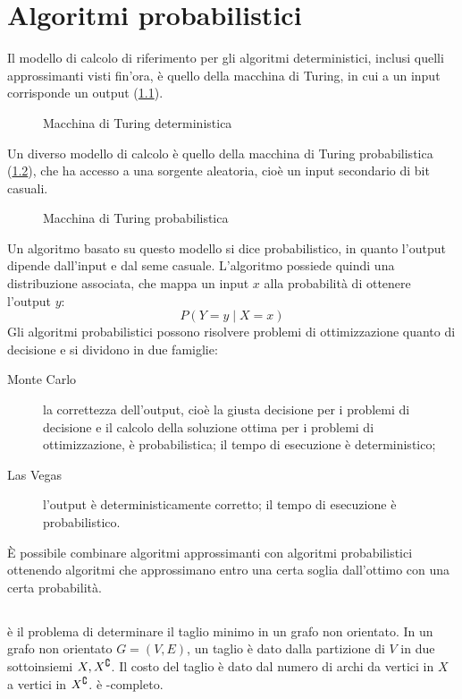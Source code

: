 \chapter{Algoritmi probabilistici}
Il modello di calcolo di riferimento per gli algoritmi deterministici, inclusi quelli approssimanti visti fin'ora, è quello della macchina di Turing, in cui a un input corrisponde un output (\cref{fig:mdtdet}).
\begin{figure}[ht]
	\centering
	
	\caption{Macchina di Turing deterministica}
	\label{fig:mdtdet}
\end{figure}

Un diverso modello di calcolo è quello della macchina di Turing probabilistica (\cref{fig:mdtprob}), che ha accesso a una sorgente aleatoria, cioè un input secondario di bit casuali.

\begin{figure}[ht]
	\centering
	
	\caption{Macchina di Turing probabilistica}
	\label{fig:mdtprob}
\end{figure}

Un algoritmo basato su questo modello si dice probabilistico, in quanto l'output dipende dall'input e dal seme casuale.
L'algoritmo possiede quindi una distribuzione associata, che mappa un input $x$ alla probabilità di ottenere l'output $y$:
\begin{equation*}
	P(Y = y \mid X = x)
\end{equation*}
Gli algoritmi probabilistici possono risolvere problemi di ottimizzazione quanto di decisione e si dividono in due famiglie:
\begin{description}
	\item[Monte Carlo] la correttezza dell'output, cioè la giusta decisione per i problemi di decisione e il calcolo della soluzione ottima per i problemi di ottimizzazione, è probabilistica; il tempo di esecuzione è deterministico;
	\item[Las Vegas] l'output è deterministicamente corretto; il tempo di esecuzione è probabilistico.
\end{description}
È possibile combinare algoritmi approssimanti con algoritmi probabilistici ottenendo algoritmi che approssimano entro una certa soglia dall'ottimo con una certa probabilità.



\section{\MinCut}
\MinCut è il problema di determinare il taglio minimo in un grafo non orientato.
In un grafo non orientato $G=(V,E)$, un taglio è dato dalla partizione di $V$ in due sottoinsiemi $X, X^\complement$.
Il costo del taglio è dato dal numero di archi da vertici in $X$ a vertici in $X^\complement$.
\MinCut è \NPO-completo.

